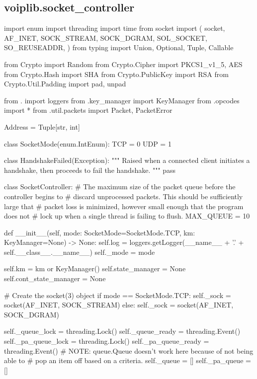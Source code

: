 \subsection{voiplib.socket\_controller}
\begin{pythoncode}
import enum
import threading
import time
from socket import (
    socket, AF_INET, SOCK_STREAM, SOCK_DGRAM, SOL_SOCKET, SO_REUSEADDR,
)
from typing import Union, Optional, Tuple, Callable

from Crypto import Random
from Crypto.Cipher import PKCS1_v1_5, AES
from Crypto.Hash import SHA
from Crypto.PublicKey import RSA
from Crypto.Util.Padding import pad, unpad

from . import loggers
from .key_manager import KeyManager
from .opcodes import *
from .util.packets import Packet, PacketError


Address = Tuple[str, int]


class SocketMode(enum.IntEnum):
    TCP = 0
    UDP = 1


class HandshakeFailed(Exception):
    """
    Raised when a connected client initiates a handshake, then proceeds to fail
    the handshake.
    """
    pass


class SocketController:
    # The maximum size of the packet queue before the controller begins to
    # discard unprocessed packets. This should be sufficiently large that
    # packet loss is minimized, however small enough that the program does not
    # lock up when a single thread is failing to flush.
    MAX_QUEUE = 10

    def __init__(self, mode: SocketMode=SocketMode.TCP, km: KeyManager=None) -> None:
        self.log = loggers.getLogger(__name__ + '.' + self.__class__.__name__)
        self._mode = mode

        self.km = km or KeyManager()
        self.state_manager = None
        self.cont_state_manager = None

        # Create the socket(3) object
        if mode == SocketMode.TCP:
            self._sock = socket(AF_INET, SOCK_STREAM)
        else:
            self._sock = socket(AF_INET, SOCK_DGRAM)

        self._queue_lock = threading.Lock()
        self._queue_ready = threading.Event()
        self._pa_queue_lock = threading.Lock()
        self._pa_queue_ready = threading.Event()
        # NOTE: queue.Queue doesn't work here because of not being able to
        #       pop an item off based on a criteria.
        self._queue = []
        self._pa_queue = []


\end{pythoncode}
